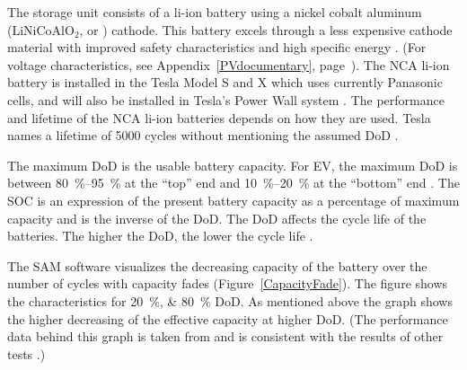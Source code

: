 The storage unit consists of a \ac{li-ion} battery using a nickel cobalt aluminum (LiNiCoAlO$_2$,  or ) cathode. This battery excels through a less expensive cathode material with improved safety characteristics and high specific energy \cite{NREL2015a}. (For voltage characteristics, see Appendix~\ref{PVdocumentary}, page~\pageref{EES_VoltageDischarge}). The \ac{NCA} \ac{li-ion} battery is installed in the Tesla Model S and X \cite{Nykvist2015} which uses currently Panasonic cells, and will also be installed in Tesla's Power Wall system \cite{Shahan2015}. The performance and lifetime of the \ac{NCA} \ac{li-ion} batteries depends on how they are used. Tesla names a lifetime of \num{5000} cycles without mentioning the assumed \ac{DoD} \cite{Shahan2015}.



The maximum \ac{DoD} is the usable battery capacity. For \ac{EV}, the maximum \ac{DoD} is between \SIrange{80}{95}{\percent} at the \enquote{top} end and \SIrange{10}{20}{\percent} at the \enquote{bottom} end \cite{Warner2014}. The \ac{SOC} is an expression of the present battery capacity as a percentage of maximum capacity and is the inverse of the \ac{DoD}. The \ac{DoD} affects the cycle life of the batteries. The higher the \ac{DoD}, the lower the cycle life \cite{MitElectricVehilceTeam2008}.


The \ac{SAM} software visualizes the decreasing capacity of the battery over the number of cycles with capacity fades (Figure~\ref{CapacityFade}). The figure shows the characteristics for \SIlist{20;80}{\percent} \ac{DoD}. As mentioned above the graph shows the higher decreasing of the effective capacity at higher \ac{DoD}. (The performance data behind this graph is taken from \cite{Dahn2011} and is consistent with the results of other tests \cite{Read2009}.)

